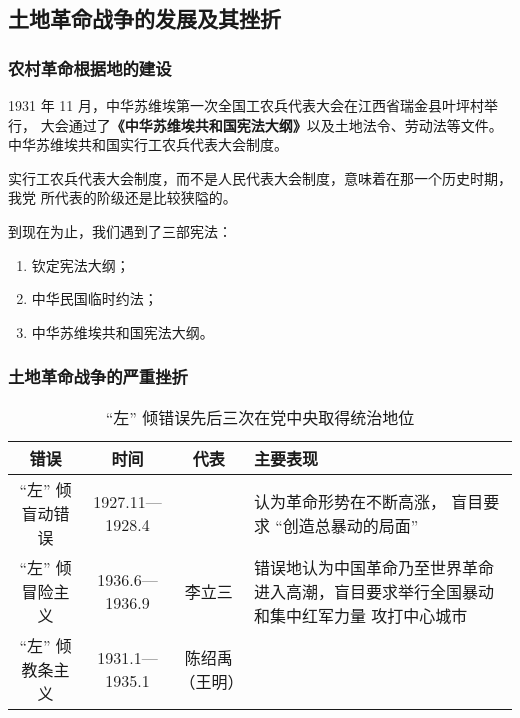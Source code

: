 \documentclass[10pt, UTF8]{ctexbook} %
\begin{document}
\subsection{土地革命战争的发展及其挫折}

\subsubsection{农村革命根据地的建设}

1931 年 11 月，中华苏维埃第一次全国工农兵代表大会在江西省瑞金县叶坪村举行，
大会通过了\textbf{《中华苏维埃共和国宪法大纲》}以及土地法令、劳动法等文件。
中华苏维埃共和国实行工农兵代表大会制度。
\begin{remark}
    实行工农兵代表大会制度，而不是人民代表大会制度，意味着在那一个历史时期，我党
    所代表的阶级还是比较狭隘的。
\end{remark}

\begin{mdframed}[frametitle={《中国近现代史纲要》课程中出现的宪法}]
    到现在为止，我们遇到了三部宪法：
    \begin{enumerate}[label={\arabic*.}, itemsep=0pt]
        \item 钦定宪法大纲；
        \item 中华民国临时约法；
        \item 中华苏维埃共和国宪法大纲。
    \end{enumerate}
\end{mdframed}

\subsubsection{土地革命战争的严重挫折}

\begin{table}[H]
    \centering
    \caption{“左” 倾错误先后三次在党中央取得统治地位}
    \begin{tabular}{c c c p{}}
        \hline 
        错误 & 时间 & 代表 & 主要表现 \\
        \hline 
        “左” 倾盲动错误 & 1927.11—1928.4 & & 认为革命形势在不断高涨，
        盲目要求 “创造总暴动的局面” \\ 
        “左” 倾冒险主义 & 1936.6—1936.9 & 李立三 & 
        错误地认为中国革命乃至世界革命进入高潮，盲目要求举行全国暴动和集中红军力量
        攻打中心城市 \\ 
        “左” 倾教条主义 & 1931.1—1935.1 & 陈绍禹（王明） &  \\ 
        \hline
    \end{tabular}
\end{table}
\end{document}
